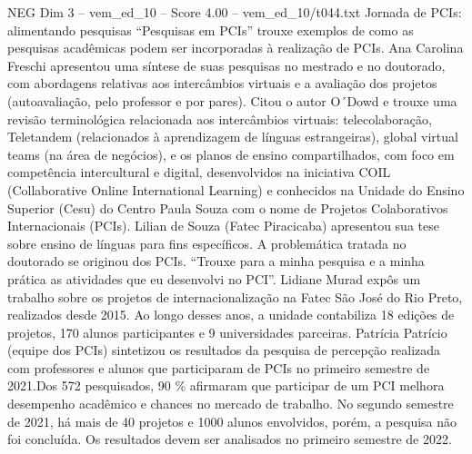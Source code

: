 \begin{textsample}{NEG Dim 3 – vem\_ed\_10 – Score 4.00 – vem\_ed\_10/t044.txt}  \label{ex:f3_neg_128}
Jornada de PCIs: alimentando pesquisas “Pesquisas em PCIs” trouxe exemplos de como as pesquisas acadêmicas podem ser incorporadas à realização de PCIs.
Ana Carolina Freschi apresentou uma síntese de suas pesquisas no mestrado e no doutorado, com abordagens relativas aos intercâmbios virtuais e a avaliação dos projetos (autoavaliação, pelo professor e por pares).
Citou o autor O´Dowd e trouxe uma revisão terminológica relacionada aos intercâmbios virtuais: telecolaboração, Teletandem (relacionados à aprendizagem de línguas estrangeiras), global virtual teams (na área de negócios), e os planos de ensino compartilhados, com foco em competência intercultural e digital, desenvolvidos na iniciativa COIL (Collaborative Online International Learning) e conhecidos na Unidade do Ensino Superior (Cesu) do Centro Paula Souza com o nome de Projetos Colaborativos Internacionais (PCIs).
Lilian de Souza (Fatec Piracicaba) apresentou sua tese sobre ensino de línguas para fins específicos.
A problemática tratada no doutorado se originou dos PCIs. “Trouxe para a minha pesquisa e a minha prática as atividades que eu desenvolvi no PCI”.
Lidiane Murad expôs um trabalho sobre os projetos de internacionalização na Fatec São José do Rio Preto, realizados desde 2015.
Ao longo desses anos, a unidade contabiliza 18 edições de projetos, 170 alunos participantes e 9 universidades parceiras.
Patrícia Patrício (equipe dos PCIs) sintetizou os resultados da pesquisa de percepção realizada com professores e alunos que participaram de PCIs no primeiro semestre de 2021.Dos 572 pesquisados, 90 \% afirmaram que participar de um PCI melhora desempenho acadêmico e chances no mercado de trabalho.
No segundo semestre de 2021, há mais de 40 projetos e 1000 alunos envolvidos, porém, a pesquisa não foi concluída.
Os resultados devem ser analisados no primeiro semestre de 2022.

\end{textsample}
